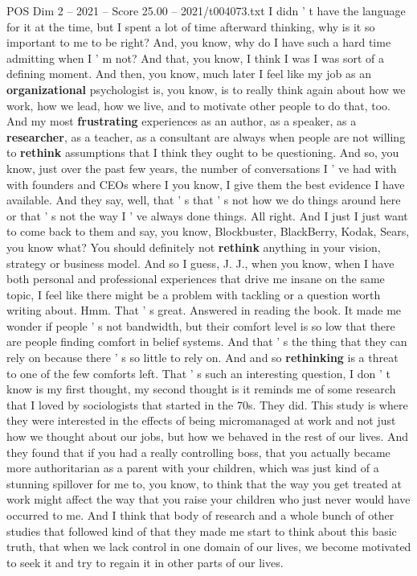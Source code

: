 \begin{textsample}{POS Dim 2 – 2021 – Score 25.00 – 2021/t004073.txt}
I didn ' t have the language for it at the time, but I spent a lot of time afterward thinking, why is it so important to me to be right?
And, you know, why do I have such a hard time admitting when I ' m not?
And that, you know, I think I was I was sort of a defining moment.
And then, you know, much later I feel like my job as an \textbf{organizational} psychologist is, you know, is to really think again about how we work, how we lead, how we live, and to motivate other people to do that, too.
And my most \textbf{frustrating} experiences as an author, as a speaker, as a \textbf{researcher}, as a teacher, as a consultant are always when people are not willing to \textbf{rethink} assumptions that I think they ought to be questioning.
And so, you know, just over the past few years, the number of conversations I ' ve had with with founders and CEOs where I you know, I give them the best evidence I have available.
And they say, well, that ' s that ' s not how we do things around here or that ' s not the way I ' ve always done things.
All right.
And I just I just want to come back to them and say, you know, Blockbuster, BlackBerry, Kodak, Sears, you know what?
You should definitely not \textbf{rethink} anything in your vision, strategy or business model.
And so I guess, J.
J., when you know, when I have both personal and professional experiences that drive me insane on the same topic, I feel like there might be a problem with tackling or a question worth writing about.
Hmm.
That ' s great.
Answered in reading the book.
It made me wonder if people ' s not bandwidth, but their comfort level is so low that there are people finding comfort in belief systems.
And that ' s the thing that they can rely on because there ' s so little to rely on.
And and so \textbf{rethinking} is a threat to one of the few comforts left.
That ' s such an interesting question, I don ' t know is my first thought, my second thought is it reminds me of some research that I loved by sociologists that started in the 70s.
They did.
This study is where they were interested in the effects of being micromanaged at work and not just how we thought about our jobs, but how we behaved in the rest of our lives.
And they found that if you had a really controlling boss, that you actually became more authoritarian as a parent with your children, which was just kind of a stunning spillover for me to, you know, to think that the way you get treated at work might affect the way that you raise your children who just never would have occurred to me.
And I think that body of research and a whole bunch of other studies that followed kind of that they made me start to think about this basic truth, that when we lack control in one domain of our lives, we become motivated to seek it and try to regain it in other parts of our lives.

\end{textsample}
